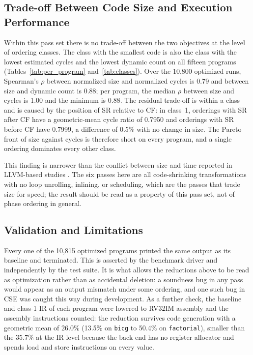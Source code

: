 \documentclass[conference]{IEEEtran}
\begin{document}
\subsection{Trade-off Between Code Size and Execution Performance}
\label{sec:tradeoff}
Within this pass set there is no trade-off between the two objectives at the level of ordering classes. The class with the smallest code is also the class with the lowest estimated cycles and the lowest dynamic count on all fifteen programs (Tables~\ref{tab:per_program} and~\ref{tab:classes}). Over the 10,800 optimized runs, Spearman's $\rho$ between normalized size and normalized cycles is 0.79 and between size and dynamic count is 0.88; per program, the median $\rho$ between size and cycles is 1.00 and the minimum is 0.88. The residual trade-off is within a class and is caused by the position of SR relative to CF: in class~1, orderings with SR after CF have a geometric-mean cycle ratio of 0.7950 and orderings with SR before CF have 0.7999, a difference of 0.5\% with no change in size. The Pareto front of size against cycles is therefore short on every program, and a single ordering dominates every other class.

This finding is narrower than the conflict between size and time reported in LLVM-based studies \cite{ref8}. The six passes here are all code-shrinking transformations with no loop unrolling, inlining, or scheduling, which are the passes that trade size for speed; the result should be read as a property of this pass set, not of phase ordering in general.

\subsection{Validation and Limitations}
\label{sec:validation}
Every one of the 10,815 optimized programs printed the same output as its baseline and terminated. This is asserted by the benchmark driver and independently by the test suite. It is what allows the reductions above to be read as optimization rather than as accidental deletion: a soundness bug in any pass would appear as an output mismatch under some ordering, and one such bug in CSE was caught this way during development. As a further check, the baseline and class-1 IR of each program were lowered to RV32IM assembly and the assembly instructions counted: the reduction survives code generation with a geometric mean of 26.0\% (13.5\% on \texttt{bicg} to 50.4\% on \texttt{factorial}), smaller than the 35.7\% at the IR level because the back end has no register allocator and spends load and store instructions on every value.
\end{document}
